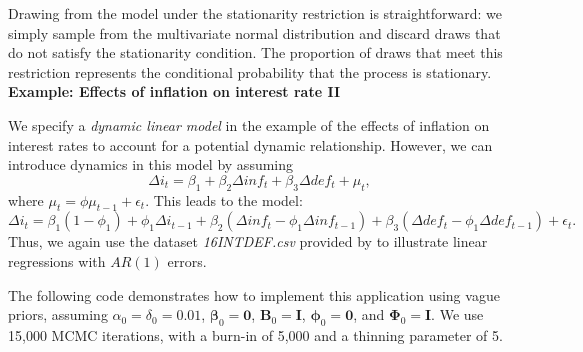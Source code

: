 Drawing from the model under the stationarity restriction is straightforward: we simply sample from the multivariate normal distribution and discard draws that do not satisfy the stationarity condition. The proportion of draws that meet this restriction represents the conditional probability that the process is stationary.\\

\textbf{Example: Effects of inflation on interest rate II}

We specify a \textit{dynamic linear model} in the example of the effects of inflation on interest rates to account for a potential dynamic relationship. However, we can introduce dynamics in this model by assuming 
\[
\Delta i_t = \beta_{1} + \beta_{2} \Delta inf_t + \beta_{3} \Delta def_t + \mu_t,
\]
where \(\mu_t = \phi \mu_{t-1} + \epsilon_t\). This leads to the model:
\[
\Delta i_t = \beta_{1}(1-\phi_1) + \phi_1 \Delta i_{t-1} + \beta_{2}(\Delta inf_t - \phi_1 \Delta inf_{t-1}) + \beta_{3}(\Delta def_t - \phi_1 \Delta def_{t-1}) + \epsilon_t.
\]
Thus, we again use the dataset \textit{16INTDEF.csv} provided by \cite[Chaps.~10]{wooldridge2016introductory} to illustrate linear regressions with $AR(1)$ errors.

The following code demonstrates how to implement this application using vague priors, assuming \(\alpha_0 = \delta_0 = 0.01\), \(\bm{\beta}_0 = \bm{0}\), \(\bm{B}_0 = \bm{I}\), \(\bm{\phi}_0 = \bm{0}\), and \(\bm{\Phi}_0 = \bm{I}\). We use 15,000 MCMC iterations, with a burn-in of 5,000 and a thinning parameter of 5.

